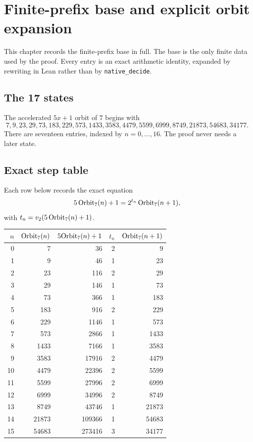 \section{Finite-prefix base and explicit orbit expansion}

This chapter records the finite-prefix base in full.  The base is the
only finite data used by the proof.  Every entry is an exact
arithmetic identity, expanded by rewriting in Lean rather than by
\texttt{native\_decide}.

\subsection{The 17 states}

The accelerated $5x+1$ orbit of $7$ begins with
\begin{equation*}
  7,9,23,29,73,183,229,573,1433,3583,4479,5599,6999,8749,
  21873,54683,34177.
\end{equation*}
There are seventeen entries, indexed by $n=0,\dots,16$.  The proof
never needs a later state.

\subsection{Exact step table}

Each row below records the exact equation
\begin{equation*}
  5\,\mathrm{Orbit}_7(n)+1=2^{t_n}\,\mathrm{Orbit}_7(n+1),
\end{equation*}
with $t_n=v_2\!\left(5\,\mathrm{Orbit}_7(n)+1\right)$.

\begin{center}
\scriptsize
\begin{tabular}{@{}rrrrr@{}}
\toprule
$n$ & $\mathrm{Orbit}_7(n)$ & $5\mathrm{Orbit}_7(n)+1$ & $t_n$ & $\mathrm{Orbit}_7(n+1)$ \\
\midrule
0 & 7 & 36 & 2 & 9 \\
1 & 9 & 46 & 1 & 23 \\
2 & 23 & 116 & 2 & 29 \\
3 & 29 & 146 & 1 & 73 \\
4 & 73 & 366 & 1 & 183 \\
5 & 183 & 916 & 2 & 229 \\
6 & 229 & 1146 & 1 & 573 \\
7 & 573 & 2866 & 1 & 1433 \\
8 & 1433 & 7166 & 1 & 3583 \\
9 & 3583 & 17916 & 2 & 4479 \\
10 & 4479 & 22396 & 2 & 5599 \\
11 & 5599 & 27996 & 2 & 6999 \\
12 & 6999 & 34996 & 2 & 8749 \\
13 & 8749 & 43746 & 1 & 21873 \\
14 & 21873 & 109366 & 1 & 54683 \\
15 & 54683 & 273416 & 3 & 34177 \\
\bottomrule
\end{tabular}
\end{center}

